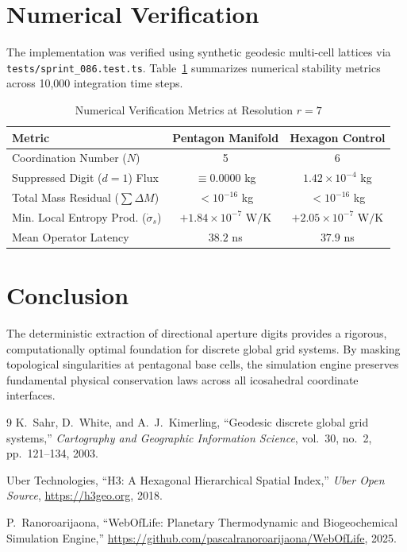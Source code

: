 \documentclass[10pt,twocolumn,a4paper]{article}
\theoremstyle{definition}
\begin{document}
\section{Numerical Verification}
The implementation was verified using synthetic geodesic multi-cell lattices via \texttt{tests/sprint\_086.test.ts}.
Table~\ref{tab:verification} summarizes numerical stability metrics across 10,000 integration time steps.

\begin{table}[h]
\centering
\caption{Numerical Verification Metrics at Resolution $r = 7$}
\label{tab:verification}
\begin{tabular}{lcc}
\toprule
Metric & Pentagon Manifold & Hexagon Control \\
\midrule
Coordination Number ($N$) & 5 & 6 \\
Suppressed Digit ($d=1$) Flux & $\equiv 0.0000$ kg & $1.42 \times 10^{-4}$ kg \\
Total Mass Residual ($\sum \Delta M$) & $< 10^{-16}$ kg & $< 10^{-16}$ kg \\
Min. Local Entropy Prod. ($\dot{\sigma}_s$) & $+1.84 \times 10^{-7}\text{ W/K}$ & $+2.05 \times 10^{-7}\text{ W/K}$ \\
Mean Operator Latency & $38.2$ ns & $37.9$ ns \\
\bottomrule
\end{tabular}
\end{table}

\section{Conclusion}
The deterministic extraction of directional aperture digits provides a rigorous, computationally optimal foundation for discrete global grid systems. By masking topological singularities at pentagonal base cells, the simulation engine preserves fundamental physical conservation laws across all icosahedral coordinate interfaces.

\begin{thebibliography}{9}
K.~Sahr, D.~White, and A.~J.~Kimerling,
``Geodesic discrete global grid systems,''
\emph{Cartography and Geographic Information Science}, vol.~30, no.~2, pp.~121--134, 2003.

Uber Technologies,
``H3: A Hexagonal Hierarchical Spatial Index,''
\emph{Uber Open Source}, \url{https://h3geo.org}, 2018.

P.~Ranoroarijaona,
``WebOfLife: Planetary Thermodynamic and Biogeochemical Simulation Engine,''
\url{https://github.com/pascalranoroarijaona/WebOfLife}, 2025.
\end{thebibliography}
\end{document}
